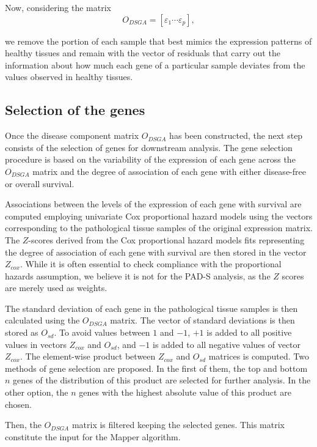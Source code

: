 Now, considering the matrix
\[
O_{DSGA} = [\varepsilon_1 \cdots \varepsilon_p],
\]

we remove the portion of each sample that best mimics the expression patterns of healthy tissues and remain with the vector of residuals that carry out the information about how much each gene of a particular sample deviates from the values observed in healthy tissues.

\hypertarget{section2.2}{%
\subsection{Selection of the genes}\label{section2.2}}

Once the disease component matrix \(O_{DSGA}\) has been constructed, the next step consists of the selection of genes for downstream analysis. The gene selection procedure is based on the variability of the expression of each gene across the \(O_{DSGA}\) matrix and the degree of association of each gene with either disease-free or overall survival.

Associations between the levels of the expression of each gene with survival are computed employing univariate Cox proportional hazard models using the vectors corresponding to the pathological tissue samples of the original expression matrix. The \(Z\)-scores derived from the Cox proportional hazard models fits representing the degree of association of each gene with survival are then stored in the vector \(Z_{cox}\). While it is often essential to check compliance with the proportional hazards assumption, we believe it is not for the PAD-S analysis, as the \(Z\) scores are merely used as weights.

The standard deviation of each gene in the pathological tissue samples is then calculated using the \(O_{DSGA}\) matrix.
The vector of standard deviations is then stored as \(O_{sd}\). To avoid values between \(1\) and \(-1\), \(+1\) is added to all positive values in vectors \(Z_{cox}\) and \(O_{sd}\), and \(-1\) is added to all negative values of vector \(Z_{cox}\). The element-wise product between \(Z_{cox}\) and \(O_{sd}\) matrices is computed. Two methods of gene selection are proposed. In the first of them, the top and bottom \(n\) genes of the distribution of this product are selected for further analysis. In the other option, the \(n\) genes with the highest absolute value of this product are chosen.

Then, the \(O_{DSGA}\) matrix is filtered keeping the selected genes. This matrix constitute the input for the Mapper algorithm.


